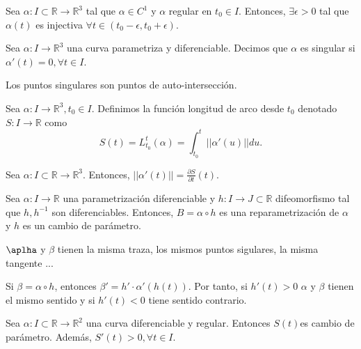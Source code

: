 \begin{lem}
  Sea $\alpha  : I \subset \mathbb{R} \to \mathbb{R}^{3}$ tal que $\alpha \in C^{1}$ y $\alpha$ regular en $t_{0} \in I$. Entonces, $\exists \epsilon > 0$ tal que $\alpha(t)$ es injectiva $\forall t \in (t_{0} - \epsilon, t_{0} + \epsilon)$.
\end{lem}

\begin{defn}
  Sea $\alpha: I \to \mathbb{R}^{3}$ una curva parametriza y diferenciable. Decimos que $\alpha$ es singular si $\alpha'(t) = 0, \forall t \in I$.
\end{defn}

\begin{obs}
  Los puntos singulares son puntos de auto-intersección.
\end{obs}

\begin{defn}
  Sea $\alpha : I \to \mathbb{R}^{3}, t_{0} \in I$. Definimos la función longitud de arco desde $t_{0}$ denotado $S: I \to \mathbb{R}$ como
  \[ 
    S(t) = L_{t_{0}}^{t}(\alpha) = \int_{t_{0}}^{t}  ||\alpha ' (u)|| du. 
  \] 
\end{defn}

\begin{lem}
  Sea $\alpha  : I \subset \mathbb{R} \to \mathbb{R}^{3}$. Entonces, $||\alpha'(t)|| = \frac{\partial{S}}{\partial{t}}(t)$.
\end{lem}

\begin{defn}[Reparametrización]
  Sea $\alpha: I \to \mathbb{R}$ una parametrización diferenciable y $h: I \to J \subset \mathbb{R}$ difeomorfismo tal que $h, h^{-1}$ son diferenciables. Entonces, $B = \alpha \circ h$ es una reparametrización de $\alpha$ y $h$ es un cambio de parámetro.
\end{defn}

\begin{obs}
  $\aplha$  y $\beta$ tienen la misma traza, los mismos puntos sigulares, la misma tangente ...
\end{obs}

\begin{obs}
  Si $\beta = \alpha \circ h$, entonces $\beta' = h' \cdot \alpha'(h(t))$. Por tanto, si $h'(t) > 0$ $\alpha$ y $\beta$ tienen el mismo sentido y si $h'(t)<0$ tiene sentido contrario.
\end{obs}

\begin{lem}
  Sea $\alpha : I \subset \mathbb{R} \to \mathbb{R}^{2}$ una curva diferenciable y regular. Entonces $S(t)$es cambio de parámetro. Además, $S'(t)>0, \forall t \in I$.
\end{lem}

